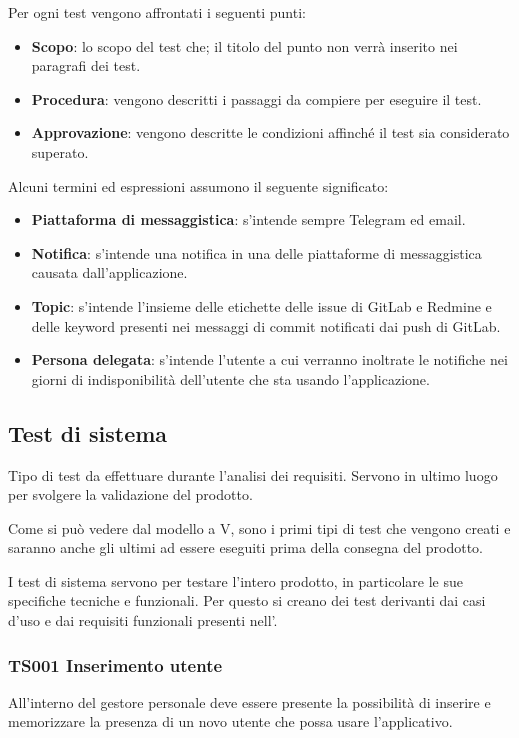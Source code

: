 Per ogni test vengono affrontati i seguenti punti:

\begin{itemize}
	\item \textbf{Scopo}: lo scopo del test che; il titolo del punto non verrà inserito nei paragrafi dei test.
	\item \textbf{Procedura}: vengono descritti i passaggi da compiere per eseguire il test.
	\item \textbf{Approvazione}: vengono descritte le condizioni affinché il test sia considerato superato.
\end{itemize}

Alcuni termini ed espressioni assumono il seguente significato:

\begin{itemize}
	\item \textbf{Piattaforma di messaggistica}: s'intende sempre Telegram ed email.
	\item \textbf{Notifica}: s'intende una notifica in una delle piattaforme di messaggistica causata dall'applicazione.
	\item \textbf{Topic}: s'intende l'insieme delle etichette delle issue di GitLab e Redmine e delle keyword presenti nei messaggi di commit notificati dai push di GitLab.
	\item \textbf{Persona delegata}: s'intende l'utente a cui verranno inoltrate le notifiche nei giorni di indisponibilità dell'utente che sta usando l'applicazione. 
\end{itemize}


\subsection{Test di sistema}
Tipo di test da effettuare durante l'analisi dei requisiti. Servono in ultimo luogo per svolgere la validazione del prodotto.

Come si può vedere dal modello a V, sono i primi tipi di test che vengono creati e saranno anche gli ultimi ad essere eseguiti prima della consegna del prodotto.

I test di sistema servono per testare l'intero prodotto, in particolare le sue specifiche tecniche e funzionali. Per questo si creano dei test derivanti dai casi d'uso e dai requisiti funzionali presenti nell'\AdRd.

	\subsubsection{TS001 Inserimento utente}
		All'interno del gestore personale deve essere presente la possibilità di inserire e memorizzare la presenza di un novo utente che possa usare l'applicativo.
		
